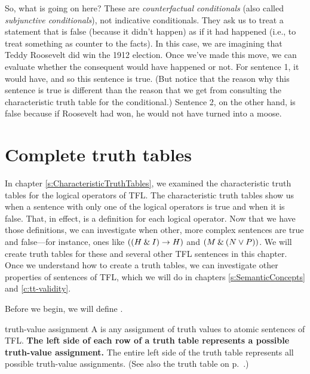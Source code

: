 So, what is going on here? These are \textit{counterfactual conditionals} (also called \textit{subjunctive conditionals}), not indicative conditionals. They ask us to treat a statement that is false (because it didn’t happen) as if it had happened (i.e., to treat something as counter to the facts). In this case, we are imagining that Teddy Roosevelt did win the 1912 election. Once we’ve made this move, we can evaluate whether the consequent would have happened or not. For sentence 1, it would have, and so this sentence is true. (But notice that the reason why this sentence is true is different than the reason that we get from consulting the characteristic truth table for the conditional.) Sentence 2, on the other hand, is false because if Roosevelt had won, he would not have turned into a moose.





\chapter{Complete truth tables}
\label{s:CompleteTruthTables}

In chapter \ref{s:CharacteristicTruthTables}, we examined the characteristic truth tables for the logical operators of TFL. The characteristic truth tables show us when a sentence with only one of the logical operators is true and when it is false. That, in effect, is a definition for each logical operator. Now that we have those definitions, we can investigate when other, more complex sentences are true and false---for instance, ones like $((H\mathbin{\&} I)\rightarrow H)$ and $(M \mathbin{\&} (N \vee P))$. We will create truth tables for these and several other TFL sentences in this chapter. Once we understand how to create a truth tables, we can investigate other properties of sentences of TFL, which we will do in chapters \ref{s:SemanticConcepts} and \ref{c:tt-validity}. 

Before we begin, we will define .

\begin{factboxy}{truth-value assignment}
A  is any assignment of truth values to atomic sentences of TFL. \textbf{The left side of each row of a truth table represents a possible truth-value assignment.} The entire left side of the truth table represents all possible truth-value assignments. (See also the truth table on p.~\pageref{truth-value-assignment}.)
\end{factboxy}

